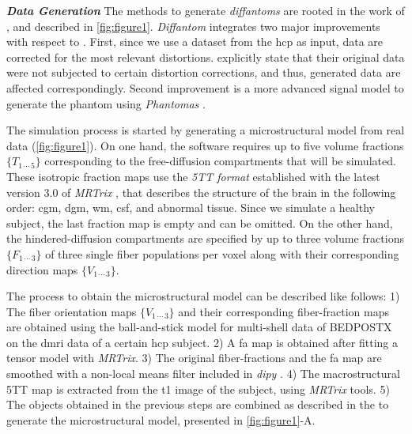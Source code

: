 \documentclass[english]{frontiers/frontiersSCNS} %
\begin{document}
\noindent\textbf{\textit{Data Generation\textcolon}\label{sec:data_generation}}
The methods to generate \emph{diffantoms} are rooted in the work of \cite{wilkins_fiber_2014}, and
  described in \autoref{fig:figure1}.
\emph{Diffantom} integrates two major improvements with respect to \citep{wilkins_fiber_2014}.
First, since we use a dataset from the \gls*{hcp} as input, data are corrected for the most relevant distortions.
\cite{wilkins_fiber_2014} explicitly state that their original data were not subjected to certain distortion
  corrections, and thus, generated data are affected correspondingly.
Second improvement is a more advanced signal model to generate the phantom using
  \emph{Phantomas} \citep{caruyer_phantomas_2014}.

The simulation process is started by generating a microstructural model from real data (\autoref{fig:figure1}).
On one hand, the software requires up to five volume fractions $\{T_{1\,\cdots\,5}\}$ corresponding to the free-diffusion
  compartments that will be simulated.
These isotropic fraction maps use the \emph{5TT format} established with the latest version 3.0 of
  \emph{MRTrix} \citep{tournier_mrtrix_2012}, that describes the structure of the brain in the following
  order: \gls*{cgm}, \gls*{dgm}, \gls*{wm}, \gls*{csf}, and abnormal tissue.
Since we simulate a healthy subject, the last fraction map is empty and can be omitted.
On the other hand, the hindered-diffusion compartments are specified by up to three volume fractions $\{F_{1\,\cdots\,3}\}$
  of three single fiber populations per voxel along with their corresponding direction maps $\{V_{1\,\cdots\,3}\}$.

The process to obtain the microstructural model can be described like follows:
1) The fiber orientation maps $\{V_{1\,\cdots\,3}\}$ and their corresponding fiber-fraction maps are
  obtained using the ball-and-stick model for multi-shell data of BEDPOSTX \citep{jbabdi_modelbased_2012}
  on the \gls*{dmri} data of a certain \gls*{hcp} subject.
2) A \gls*{fa} map is obtained after fitting a tensor model with \emph{MRTrix}.
3) The original fiber-fractions and the \gls*{fa} map are smoothed with a non-local means filter included
  in \emph{dipy} \citep{garyfallis_dipy_2011}.
4) The macrostructural 5TT map is extracted from the \acrlong*{t1} image of the subject, using \emph{MRTrix} tools.
5) The objects obtained in the previous steps are combined as described in the  to generate the
  microstructural model, presented in \autoref{fig:figure1}-A.
\end{document}
